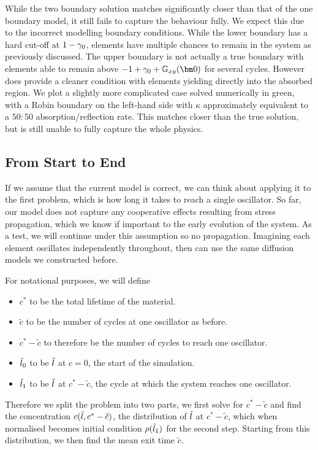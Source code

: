 While the two boundary solution matches significantly closer than that of the one boundary model, it still fails to capture the behaviour fully. We expect this due to the incorrect modelling boundary conditions. While the lower boundary has a hard cut-off at $1-\gamma_0$, elements have multiple chances to remain in the system as previously discussed. The upper boundary is not actually a true boundary with elements able to remain above $-1+\gammaMax+\Origin$ for several cycles. However does provide a cleaner condition with elements yielding directly into the absorbed region. We plot a slightly more complicated case solved numerically in green, with a Robin boundary on the left-hand side with $\kappa$ approximately equivalent to a $50:50$ absorption/reflection rate. This matches closer than the true solution, but is still unable to fully capture the whole physics. 

\subsection{From Start to End}
If we assume that the current model is correct, we can think about applying it to the first problem, which is how long it takes to reach a single oscillator. So far, our model does not capture any cooperative effects resulting from stress propagation, which we know if important to the early evolution of the system. As a test, we will continue under this assumption so no propagation. Imagining each element oscillates independently throughout, then can use the same diffusion models we constructed before. 

For notational purposes, we will define 
\begin{itemize}
    \item $c^*$ to be the total lifetime of the material.
    \item $\tilde{c}$ to be the number of cycles at one oscillator as before.
    \item $c^* - \tilde{c}$ to therefore be the number of cycles to reach one oscillator.
    \item $\tilde{l}_0$ to be $\tilde{l}$ at $c=0$, the start of the simulation.
    \item $\tilde{l}_1$ to be $\tilde{l}$ at $c^* - \tilde{c}$, the cycle at which the system reaches one oscillator. 
\end{itemize}
Therefore we split the problem into two parts, we first solve for $c^* - \tilde{c}$ and find the concentration $c(\tilde{l}, c^* - \tilde{c})$, the distribution of $\tilde{l}$ at $c^* - \tilde{c}$, which when normalised becomes initial condition $\rho(\tilde{l}_1)$ for the second step. Starting from this distribution, we then find the mean exit time $\tilde{c}$.

